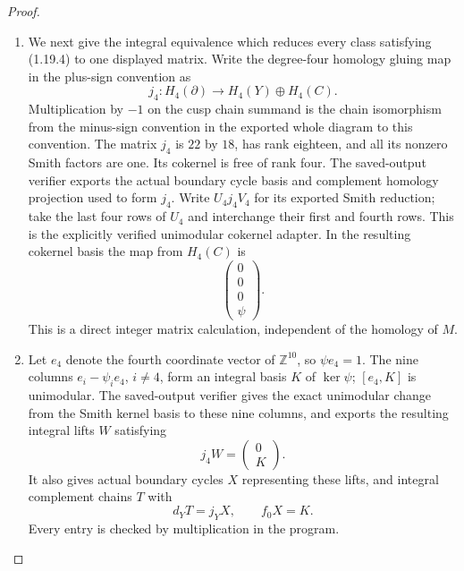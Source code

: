 \begin{proof}
\begin{enumerate}[label=\arabic*.]
\item We next give the integral equivalence which reduces every class
satisfying (1.19.4) to one displayed matrix.  Write the degree-four
homology gluing map in the plus-sign convention as
\[
 j_4:H_4(\partial)\longrightarrow H_4(Y)\oplus H_4(C).
\]
Multiplication by $-1$ on the cusp chain summand is the chain
isomorphism from the minus-sign convention in the exported whole
diagram to this convention.  The matrix $j_4$ is $22$ by $18$,
has rank eighteen, and all its nonzero Smith factors are one.
Its cokernel is free of rank four.  The saved-output verifier exports
the actual boundary cycle basis and complement homology projection
used to form $j_4$.  Write $U_4j_4V_4$ for its exported Smith reduction;
take the last four rows of $U_4$ and interchange their first and
fourth rows.  This is the explicitly verified unimodular cokernel
adapter.  In the resulting cokernel basis the map from $H_4(C)$ is
\[
 \begin{pmatrix}0\\0\\0\\\psi\end{pmatrix}.
\tag{1.19.5}
\]
This is a direct integer matrix calculation, independent of the
homology of $M$.

\item Let $e_4$ denote the fourth coordinate vector of $\mathbb Z^{10}$,
so $\psi e_4=1$.  The nine columns
$e_i-\psi_i e_4$, $i\ne4$, form an integral basis $K$ of $\ker\psi$;
$[e_4,K]$ is unimodular.  The saved-output verifier gives the exact
unimodular change from the Smith kernel basis to these nine columns,
and exports the resulting integral lifts $W$ satisfying
\[
 j_4W=\begin{pmatrix}0\\K\end{pmatrix}.
\]
It also gives actual boundary cycles $X$ representing these lifts,
and integral complement chains $T$ with
\[
 d_YT=j_YX,\qquad f_0X=K.
\tag{1.19.6}
\]
Every entry is checked by multiplication in the program.


\end{enumerate}
\end{proof}
